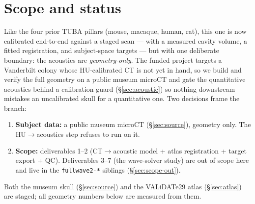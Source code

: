 \documentclass{compactarticle}
\begin{document}
\begin{abstract}
budget across the 2--4\,MHz operating band on the simulation grid, and
a grid-convergence run of the transcranial time-of-flight aberration
(the scalar a time-reversal correction must undo), which converges to
0.24\,\% between $60$ and $30\,\mu$m. The scan-dependent constants
(orientation flips, intensity thresholds, cavity hull geometry) are now
\emph{calibrated} against the staged scan, and the cavity, registration,
target, and placement outputs and their QC figures are produced by the
end-to-end driver.
The downstream wave physics (deliverables 3--7: time-reversal,
multifocal synthesis, the two-foci feasibility sweep, MI/bioheat
safety, and the per-animal export artifact) is out of scope for this
branch and consumes the $(c,\rho,dz)$ slab in the \texttt{fullwave2-*}
solver siblings. Code: \texttt{src/tuba/species/saimiri.py},
\texttt{tuba.core.hu\_acoustics}, \texttt{tuba.atlases.validate29};
data manifest + fetchers at \texttt{src/tuba/data/}.
\end{abstract}

\section{Scope and status}
\label{sec:scope}

Like the four prior TUBA pillars (mouse, macaque, human, rat), this one
is now calibrated end-to-end against a staged scan --- with a measured
cavity volume, a fitted registration, and subject-space targets --- but
with one deliberate boundary: the acoustics are \emph{geometry-only}.
The funded project targets a Vanderbilt colony whose HU-calibrated CT is
not yet in hand, so we build and verify the full geometry on a public
museum microCT and gate the quantitative acoustics behind a calibration
guard (\S\ref{sec:acoustic}) so nothing downstream mistakes an
uncalibrated skull for a quantitative one. Two decisions frame the
branch:
\begin{enumerate}[leftmargin=*]
\setlength\itemsep{0pt}
  \item \textbf{Subject data:} a public museum microCT
        (\S\ref{sec:source}), geometry only. The HU$\to$acoustics step
        refuses to run on it.
  \item \textbf{Scope:} deliverables 1--2 (CT$\to$acoustic model +
        atlas registration + target export + QC). Deliverables 3--7
        (the wave-solver study) are out of scope here and live in the
        \texttt{fullwave2-*} siblings (\S\ref{sec:scope-out}).
\end{enumerate}
Both the museum skull (\S\ref{sec:source}) and the VALiDATe29 atlas
(\S\ref{sec:atlas}) are staged; all geometry numbers below are measured
from them.
\end{document}
